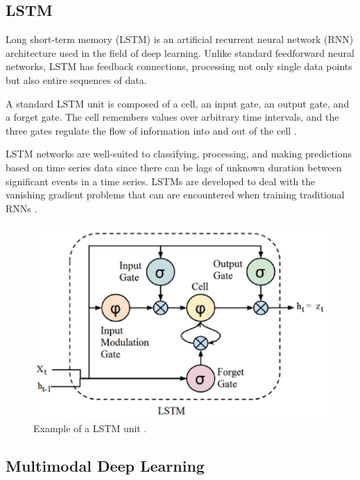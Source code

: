 \documentclass{turabian-thesis}
\begin{document}
\subsection{LSTM}

Long short-term memory (LSTM) is an artificial recurrent neural network (RNN) architecture used in the field of deep learning. Unlike standard feedforward neural networks, LSTM has feedback connections, processing not only single data points but also entire sequences of data. 

A standard LSTM unit is composed of a cell, an input gate, an output gate, and a forget gate. The cell remembers values over arbitrary time intervals, and the three gates regulate the flow of information into and out of the cell \cite{donahue_long-term_2016}.

LSTM networks are well-suited to classifying, processing, and making predictions based on time series data since there can be lags of unknown duration between significant events in a time series. LSTMs are developed to deal with the vanishing gradient problems that can are encountered when training traditional RNNs \cite{donahue_long-term_2016}. 

\begin{figure}[h!]
   \begin{center}
      \includegraphics[scale=0.5]{../media/lstm_highlight.png}
   \end{center}
   \caption{Example of a LSTM unit \cite{donahue_long-term_2016}.}
   \label{fig:reinforcementAgent}
\end{figure}

\subsection{Multimodal Deep Learning}
\end{document}
